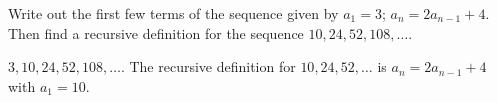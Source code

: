 \begin{questions}
%
	
	
	


\question Write out the first few terms of the sequence given by $a_1 = 3$; $a_n = 2a_{n-1} + 4$.  Then find a recursive definition for the sequence $10, 24, 52, 108, \ldots$.

	\begin{answer}
		$3, 10, 24, 52, 108,\ldots$.  The recursive definition for $10, 24, 52, \ldots$ is $a_n = 2a_{n-1} + 4$ with $a_1 = 10$.
	\end{answer}
	

\end{questions}
